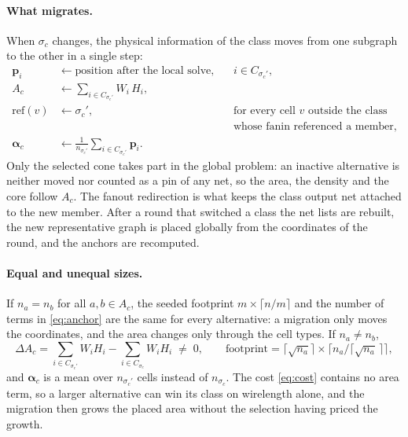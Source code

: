 \paragraph{What migrates.}
When $\sigma_c$ changes, the physical information of the class moves from
one subgraph to the other in a single step:
\begin{equation}
\begin{aligned}
  \mathbf p_i &\leftarrow \text{position after the local solve},
     && i\in C_{\sigma_c'},\\
  A_c &\leftarrow \sum_{i\in C_{\sigma_c'}} W_i\,H_i,\\
  \mathrm{ref}(v) &\leftarrow \sigma_c',
     && \text{for every cell $v$ outside the class}\\
  &&& \text{whose fanin referenced a member},\\
  \boldsymbol\alpha_c &\leftarrow \frac{1}{n_{\sigma_c'}}
     \sum_{i\in C_{\sigma_c'}}\mathbf p_i .
\end{aligned}
\label{eq:migrate}
\end{equation}
Only the selected cone takes part in the global problem: an inactive
alternative is neither moved nor counted as a pin of any net, so the
area, the density and the core follow $A_c$.  The fanout redirection is
what keeps the class output net attached to the new member.  After a round that
switched a class the net lists are rebuilt, the new representative graph
is placed globally from the coordinates of the round, and the anchors
are recomputed.

\paragraph{Equal and unequal sizes.}
If $n_a=n_b$ for all $a,b\in A_c$, the seeded footprint
$m\times\lceil n/m\rceil$ and the number of terms in \eqref{eq:anchor}
are the same for every alternative: a migration only moves the
coordinates, and the area changes only through the cell types.  If
$n_a\neq n_b$,
\begin{equation}
  \Delta A_c
  =\sum_{i\in C_{\sigma_c'}}W_iH_i-\sum_{i\in C_{\sigma_c}}W_iH_i
  \;\neq\;0,
  \qquad
  \text{footprint}
  =\Big\lceil\sqrt{n_a}\Big\rceil
   \times\Big\lceil n_a/\big\lceil\sqrt{n_a}\,\big\rceil\Big\rceil,
  \label{eq:size}
\end{equation}
and $\boldsymbol\alpha_c$ is a mean over $n_{\sigma_c'}$ cells instead of
$n_{\sigma_c}$.  The cost \eqref{eq:cost} contains no area term, so a
larger alternative can win its class on wirelength alone, and the
migration then grows the placed area without the selection having priced
the growth.
